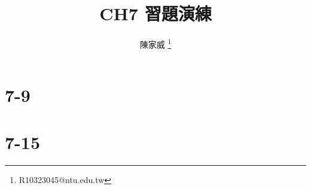 \documentclass[handout, mathserif]{beamer}
\title{CH7 習題演練}
\author{陳家威 \thanks{R10323045@ntu.edu.tw}}
\begin{document}
    \begin{frame}    
        \maketitle
    \end{frame}

    \section{7-9}
    

    \section{7-15}
    
\end{document}
